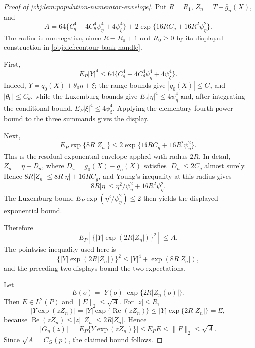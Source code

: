 \begin{proof}[Proof of \cref{obj:lem:population-numerator-envelope}]
Put \(R=R_1\), \(Z_n=T-\bar g_n(X)\), and
\[
A=
64\{C_q^4+4C_\theta^4\psi_\eta^4+4\psi_\xi^4\}
+2\exp\{16RC_g+16R^2\psi_\eta^2\}.
\]
The radius is nonnegative, since \(R=R_0+1\) and \(R_0\ge0\) by its displayed construction in \cref{obj:def:contour-bank-handle}. %

First,
\[
E_P|Y|^4
\le
64\{C_q^4+4C_\theta^4\psi_\eta^4+4\psi_\xi^4\}.
\]
Indeed, \(Y=q_0(X)+\theta_0\eta+\xi\); the range bounds give
\(|q_0(X)|\le C_q\) and \(|\theta_0|\le C_\theta\), while the Luxemburg bounds give
\(E_P|\eta|^4\le4\psi_\eta^4\) and, after integrating the conditional bound,
\(E_P|\xi|^4\le4\psi_\xi^4\). Applying the elementary fourth-power bound to the
three summands gives the display. %

Next,
\[
E_P\exp\{8R|Z_n|\}
\le
2\exp\{16RC_g+16R^2\psi_\eta^2\}.
\]
This is the residual exponential envelope applied with radius \(2R\). In detail,
\(Z_n=\eta+D_n\), where \(D_n=g_0(X)-\bar g_n(X)\) satisfies
\(|D_n|\le2C_g\) almost surely. Hence
\(8R|Z_n|\le 8R|\eta|+16RC_g\), and Young's inequality at this radius gives
\[
8R|\eta|\le \eta^2/\psi_\eta^2+16R^2\psi_\eta^2.
\]
The Luxemburg bound \(E_P\exp(\eta^2/\psi_\eta^2)\le2\) then yields the displayed
exponential bound. %

Therefore
\[
E_P\left[\{|Y|\exp(2R|Z_n|)\}^2\right]
\le
A.
\]
The pointwise inequality used here is
\[
\{|Y|\exp(2R|Z_n|)\}^2
\le
|Y|^4+\exp(8R|Z_n|),
\]
and the preceding two displays bound the two expectations. %

Let
\[
E(o)=|Y(o)|\exp\{2R|Z_n(o)|\}.
\]
Then \(E\in L^2(P)\) and \(\|E\|_2\le\sqrt A\). For \(|z|\le R\),
\[
\left|Y\exp(zZ_n)\right|
=
|Y|\exp\{\operatorname{Re}(zZ_n)\}
\le
|Y|\exp\{2R|Z_n|\}
=E,
\]
because \(\operatorname{Re}(zZ_n)\le |z|\,|Z_n|\le2R|Z_n|\). Hence
\[
|G_n(z)|
=
\left|E_P\{Y\exp(zZ_n)\}\right|
\le
E_P E
\le
\|E\|_2
\le
\sqrt A.
\]
Since \(\sqrt A=C_G(p)\), the claimed bound follows. %
\end{proof}
